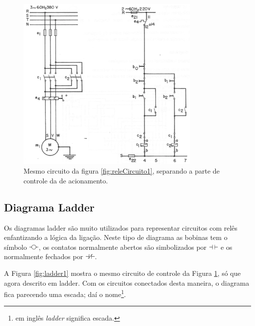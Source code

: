 \begin{figure}[hbt]
  \begin{center}
    \includegraphics[width=0.8\textwidth]{figuras/releCircuito2} %
  \end{center}
  \caption{Mesmo circuito da figura \ref{fig:releCircuito1}, separando a parte de controle da de acionamento.}
  \label{fig:releCircuito2}
\end{figure}

\subsection{Diagrama Ladder}
\label{sec:diagrama-ladder}

Os diagramas ladder são muito utilizados para representar circuitos com relês enfantizando a lógica da ligação. Neste tipo de diagrama as bobinas tem o símbolo \includegraphics[height=0.8em]{figuras/bobina_ladder}, os contatos normalmente abertos são simbolizados por \includegraphics[height=0.8em]{figuras/na_ladder} e os normalmente fechados por \includegraphics[height=0.8em]{figuras/nf_ladder}.

A Figura \ref{fig:ladder1} mostra o mesmo circuito de controle da Figura \ref{fig:releCircuito2}, só que agora descrito em ladder. Com os circuitos conectados desta maneira, o diagrama fica parecendo uma escada; daí o nome\footnote{em inglês \emph{ladder} significa escada.}.


